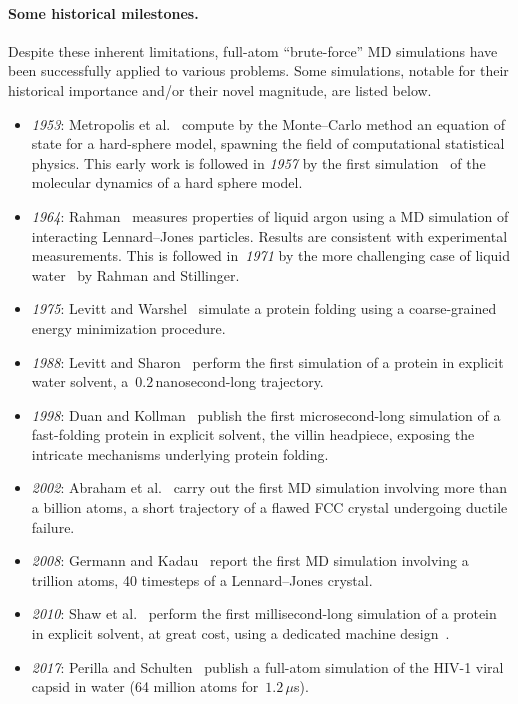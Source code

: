 \paragraph{Some historical milestones.}
\label{par:01:milestones}
Despite these inherent limitations, full-atom ``brute-force'' MD simulations have been successfully applied to various problems. Some simulations, notable for their historical importance and/or their novel magnitude, are listed below.
\begin{itemize}
    \item{\textit{1953}: Metropolis et al.~\cite{MRTT53} compute by the Monte--Carlo method an equation of state for a hard-sphere model, spawning the field of computational statistical physics. This early work is followed in \textit{1957} by the first simulation~\cite{AWal57} of the molecular dynamics of a hard sphere model.}
    \item{\textit{1964}: Rahman~\cite{R64} measures properties of liquid argon using a MD simulation of interacting Lennard--Jones particles. Results are consistent with experimental measurements. This is followed in~\textit{1971} by the more challenging case of liquid water~\cite{RS71} by Rahman and Stillinger.}
    \item{\textit{1975}: Levitt and Warshel~\cite{LW75} simulate a protein folding using a coarse-grained energy minimization procedure.}
    \item{\textit{1988}: Levitt and Sharon~\cite{LS88} perform the first simulation of a protein in explicit water solvent, a~$0.2$\,nanosecond-long trajectory.}
    \item{\textit{1998}: Duan and Kollman~\cite{DK98} publish the first microsecond-long simulation of a fast-folding protein in explicit solvent, the villin headpiece, exposing the intricate mechanisms underlying protein folding.}
    \item{\textit{2002}: Abraham et al.~\cite{AWGDDDLRS02} carry out the first MD simulation involving more than a billion atoms, a short trajectory of a flawed FCC crystal undergoing ductile failure.}
    \item{\textit{2008}: Germann and Kadau~\cite{GK08} report the first MD simulation involving a trillion atoms, 40 timesteps of a Lennard--Jones crystal.}
    \item{\textit{2010}: Shaw et al.~\cite{SMLLPDEBJSSal10} perform the first millisecond-long simulation of a protein in explicit solvent, at great cost, using a dedicated machine design~\cite{SDDKLSYBBCal08}.}
    \item{\textit{2017}: Perilla and Schulten~\cite{PS17} publish a full-atom simulation of the HIV-1 viral capsid in water (64 million atoms for~$1.2\,\mu$s).}
\end{itemize}

